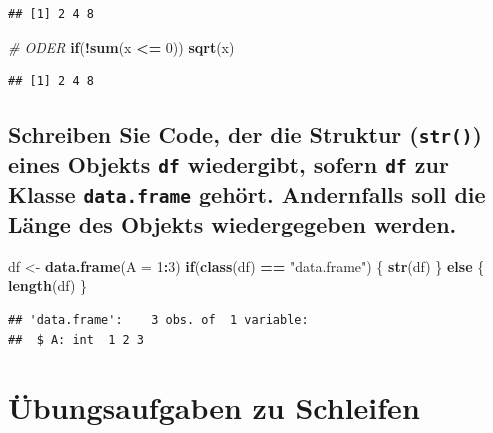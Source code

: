 \documentclass[12pt,a4paper]{article}
\newenvironment{Shaded}{\begin{snugshade}}{\end{snugshade}}
\newcommand{\AttributeTok}[1]{\textcolor[rgb]{0.13,0.29,0.53}{#1}}
\newcommand{\CommentTok}[1]{\textcolor[rgb]{0.56,0.35,0.01}{\textit{#1}}}
\newcommand{\ControlFlowTok}[1]{\textcolor[rgb]{0.13,0.29,0.53}{\textbf{#1}}}
\newcommand{\DecValTok}[1]{\textcolor[rgb]{0.00,0.00,0.81}{#1}}
\newcommand{\FunctionTok}[1]{\textcolor[rgb]{0.13,0.29,0.53}{\textbf{#1}}}
\newcommand{\NormalTok}[1]{#1}
\newcommand{\OtherTok}[1]{\textcolor[rgb]{0.56,0.35,0.01}{#1}}
\newcommand{\SpecialCharTok}[1]{\textcolor[rgb]{0.81,0.36,0.00}{\textbf{#1}}}
\newcommand{\StringTok}[1]{\textcolor[rgb]{0.31,0.60,0.02}{#1}}
\begin{document}
\begin{verbatim}
## [1] 2 4 8
\end{verbatim}

\begin{Shaded}
\begin{Highlighting}[]
    \CommentTok{\# ODER}
    \ControlFlowTok{if}\NormalTok{(}\SpecialCharTok{!}\FunctionTok{sum}\NormalTok{(x }\SpecialCharTok{\textless{}=} \DecValTok{0}\NormalTok{)) }\FunctionTok{sqrt}\NormalTok{(x)}
\end{Highlighting}
\end{Shaded}

\begin{verbatim}
## [1] 2 4 8
\end{verbatim}

\subsection{\texorpdfstring{Schreiben Sie Code, der die Struktur
(\texttt{str()}) eines Objekts \texttt{df} wiedergibt, sofern
\texttt{df} zur Klasse \texttt{data.frame} gehört. Andernfalls soll die
Länge des Objekts wiedergegeben
werden.}{Schreiben Sie Code, der die Struktur () eines Objekts  wiedergibt, sofern  zur Klasse  gehört. Andernfalls soll die Länge des Objekts wiedergegeben werden.}}\label{schreiben-sie-code-der-die-struktur-eines-objekts-wiedergibt-sofern-zur-klasse-gehuxf6rt.-andernfalls-soll-die-luxe4nge-des-objekts-wiedergegeben-werden.}

\begin{Shaded}
\begin{Highlighting}[]
\NormalTok{    df }\OtherTok{\textless{}{-}} \FunctionTok{data.frame}\NormalTok{(}\AttributeTok{A =} \DecValTok{1}\SpecialCharTok{:}\DecValTok{3}\NormalTok{)}
    \ControlFlowTok{if}\NormalTok{(}\FunctionTok{class}\NormalTok{(df) }\SpecialCharTok{==} \StringTok{"data.frame"}\NormalTok{) \{}
      \FunctionTok{str}\NormalTok{(df)}
\NormalTok{    \} }\ControlFlowTok{else}\NormalTok{ \{}
      \FunctionTok{length}\NormalTok{(df)}
\NormalTok{    \}}
\end{Highlighting}
\end{Shaded}

\begin{verbatim}
## 'data.frame':    3 obs. of  1 variable:
##  $ A: int  1 2 3
\end{verbatim}

\section{Übungsaufgaben zu
Schleifen}\label{uxfcbungsaufgaben-zu-schleifen}
\end{document}

